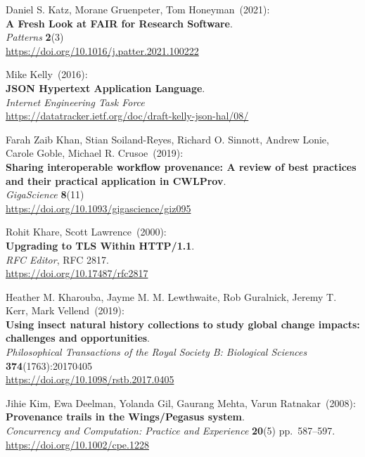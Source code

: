 \begin{thebibliography}{9}
Daniel S. Katz, Morane Gruenpeter, Tom Honeyman~(2021): \\
\textbf{A Fresh Look at FAIR for Research Software}.\\
\emph{Patterns} \textbf{2}(3) \\
\url{https://doi.org/10.1016/j.patter.2021.100222}

Mike Kelly~(2016): \\
\textbf{JSON Hypertext Application Language}.\\
\emph{Internet Engineering Task Force}\\
\url{https://datatracker.ietf.org/doc/draft-kelly-json-hal/08/}

Farah Zaib Khan, Stian Soiland-Reyes, Richard O. Sinnott,
Andrew Lonie, Carole Goble, Michael R. Crusoe~(2019): \\
\textbf{Sharing interoperable workflow provenance: A review of best
practices and their practical application in CWLProv}.\\
\emph{GigaScience} \textbf{8}(11)\\
\url{https://doi.org/10.1093/gigascience/giz095}

Rohit Khare, Scott Lawrence~(2000): \\
\textbf{Upgrading to {TLS Within HTTP}/1.1}.\\
\emph{RFC Editor}, RFC 2817. \\
\url{https://doi.org/10.17487/rfc2817}

Heather M. Kharouba, Jayme M. M. Lewthwaite, Rob Guralnick, Jeremy T. Kerr, Mark Vellend~(2019): \\
\textbf{Using insect natural history collections to study global change impacts: challenges and opportunities}.\\
\emph{Philosophical Transactions of the Royal Society B: Biological Sciences}
\textbf{374}(1763):20170405\\
\url{https://doi.org/10.1098/rstb.2017.0405}

Jihie Kim, Ewa Deelman, Yolanda Gil, Gaurang Mehta, Varun
Ratnakar~(2008): \\
\textbf{Provenance trails in the Wings/Pegasus system}.\\
\emph{Concurrency and Computation: Practice and Experience}
\textbf{20}(5) pp.~587--597.\\
\url{https://doi.org/10.1002/cpe.1228}


\end{thebibliography}
